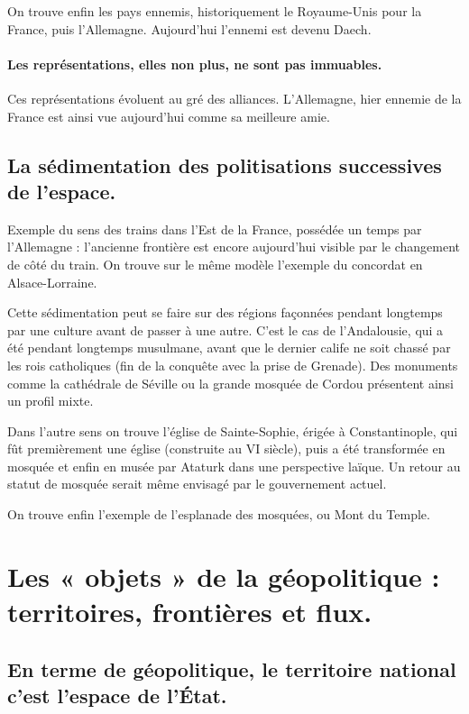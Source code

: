 \documentclass[a4paper,10pt]{article}
\begin{document}
		On trouve enfin les pays ennemis, historiquement le Royaume-Unis pour la France, puis l'Allemagne.
		Aujourd'hui l'ennemi est devenu Daech.

		\paragraph{Les représentations, elles non plus, ne sont pas immuables.}

		Ces représentations évoluent au gré des alliances.
		L'Allemagne, hier ennemie de la France est ainsi vue aujourd'hui comme sa meilleure amie.

	\subsection{La sédimentation des politisations successives de l'espace.}

		Exemple du sens des trains dans l'Est de la France, possédée un temps par l'Allemagne : l'ancienne frontière est encore aujourd'hui visible par le changement de côté du train.
		On trouve sur le même modèle l'exemple du concordat en Alsace-Lorraine.

		Cette sédimentation peut se faire sur des régions façonnées pendant longtemps par une culture avant de passer à une autre.
		C'est le cas de l'Andalousie, qui a été pendant longtemps musulmane, avant que le dernier calife ne soit chassé par les rois catholiques (fin de la conquête avec la prise de Grenade).
		Des monuments comme la cathédrale de Séville ou la grande mosquée de Cordou présentent ainsi un profil mixte.

		Dans l'autre sens on trouve l'église de Sainte-Sophie, érigée à Constantinople, qui fût premièrement une église (construite au VI siècle), puis a été transformée en mosquée et enfin en musée par Ataturk dans une perspective laïque.
		Un retour au statut de mosquée serait même envisagé par le gouvernement actuel.

		On trouve enfin l'exemple de l'esplanade des mosquées, ou Mont du Temple.


\section{Les « objets » de la géopolitique : territoires, frontières et flux.}

	\subsection{En terme de géopolitique, le territoire national c'est l'espace de l'État.}
\end{document}
